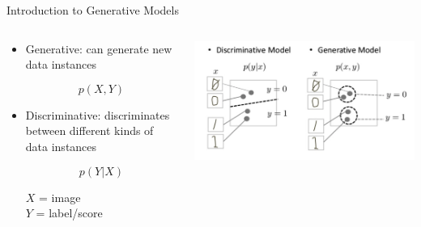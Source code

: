 \documentclass[8pt,xcolor=table,aspectratio=169]{beamer}
\begin{document}
\begin{frame}{Introduction to Generative Models}

\begin{columns}
\begin{column}{0.5\textwidth}

\begin{itemize}
 \item Generative: can generate new data instances
 
 $$ p(X,Y) $$
 
 \item Discriminative: discriminates between different kinds of data instances
 
 $$ p(Y|X) $$
 

 $X$ = image\\
 $Y$ = label/score
 

\end{itemize}

\end{column}
\begin{column}{0.5\textwidth}
\includegraphics[width=\textwidth]{YM8rTF1.png} 

\end{column}
\end{columns}

\end{frame}
\end{document}
